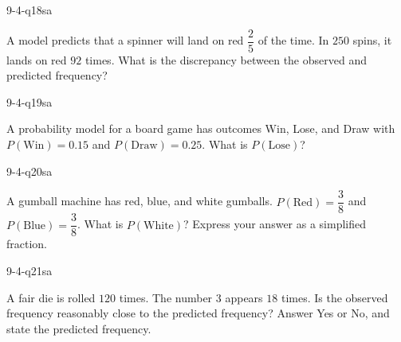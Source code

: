 \begin{practiceQuestion}{9-4-q18}{sa}
\begin{questionText}
A model predicts that a spinner will land on red $\dfrac{2}{5}$ of the time. In $250$ spins, it lands on red $92$ times. What is the discrepancy between the observed and predicted frequency?
\end{questionText}
\end{practiceQuestion}

\begin{practiceQuestion}{9-4-q19}{sa}
\begin{questionText}
A probability model for a board game has outcomes Win, Lose, and Draw with $P(\text{Win}) = 0.15$ and $P(\text{Draw}) = 0.25$. What is $P(\text{Lose})$?
\end{questionText}
\end{practiceQuestion}

\begin{practiceQuestion}{9-4-q20}{sa}
\begin{questionText}
A gumball machine has red, blue, and white gumballs. $P(\text{Red}) = \dfrac{3}{8}$ and $P(\text{Blue}) = \dfrac{3}{8}$. What is $P(\text{White})$? Express your answer as a simplified fraction.
\end{questionText}
\end{practiceQuestion}

\begin{practiceQuestion}{9-4-q21}{sa}
\begin{questionText}
A fair die is rolled $120$ times. The number $3$ appears $18$ times. Is the observed frequency reasonably close to the predicted frequency? Answer Yes or No, and state the predicted frequency.
\end{questionText}
\end{practiceQuestion}

